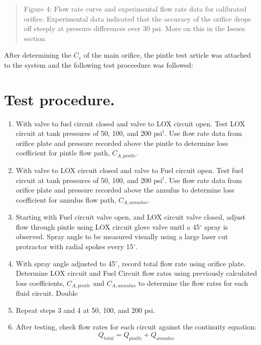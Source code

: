 \documentclass[11pt]{article}
\begin{document}
\begin{quote}
Figure 4: Flow rate curve and experimental flow rate data for calibrated
orifice. Experimental data indicated that the accuracy of the orifice
drops off steeply at pressure differences over 30 psi. More on this in
the Issues section
\end{quote}

After determining the \(C_v\) of the main orifice, the pintle test
article was attached to the system and the following test proceedure was
followed:

    \section{Test procedure.}\label{test-procedure.}

\begin{enumerate}
\def\labelenumi{\arabic{enumi}.}
\item
  With valve to fuel circuit closed and valve to LOX circuit open. Test
  LOX circuit at tank pressures of 50, 100, and 200 psi\(^\dagger\). Use
  flow rate data from orifice plate and pressure recorded above the
  pintle to determine loss coefficient for pintle flow path,
  \(C_{A,pintle}\).
\item
  With valve to LOX circuit closed and valve to Fuel circuit open. Test
  fuel circuit at tank pressures of 50, 100, and 200 psi\(^\dagger\).
  Use flow rate data from orifice plate and pressure recorded above the
  annulus to determine loss coefficient for annulus flow path,
  \(C_{A,annulus}\).
\item
  Starting with Fuel circuit valve open, and LOX circuit valve closed,
  adjust flow through pintle using LOX circuit glove valve unitl a
  45\(^{\circ}\) spray is observed. Spray angle to be measured visually
  using a large laser cut protractor with radial spokes every
  15\(^{\circ}\).
\item
  With spray angle adjusted to 45\(^{\circ}\), record total flow rate
  using orifice plate. Determine LOX circuit and Fuel Circuit flow rates
  using previously calculated loss coefficients, \(C_{A,pintle}\) and
  \(C_{A,annulus}\) to determine the flow rates for each fluid circuit.
  Double
\item
  Repeat steps 3 and 4 at 50, 100, and 200 psi.
\item
  After testing, check flow rates for each circuit against the
  continuity equation: \[Q_{total} = Q_{pintle}+Q_{annulus} \]
\end{enumerate}
\end{document}
